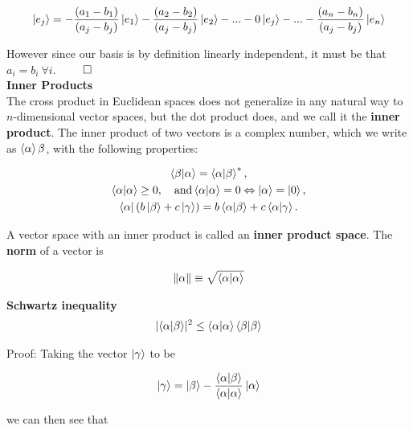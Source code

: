 \documentclass{article}
\begin{document}
\begin{gather*}
    \ket{e_{j}} = -\frac{(a_{1} - b_{1})}{(a_{j} - b_{j})}\ket{e_{1}} - \frac{(a_{2} - b_{2})}{(a_{j} - b_{j})}\ket{e_{2}} - ... - 0\ket{e_{j}} - ... - \frac{(a_{n} - b_{n})}{(a_{j} - b_{j})}\ket{e_{n}}    
\end{gather*}

However since our basis is by definition linearly independent, it must be that $a_{i} = b_{i}\ \forall i$. $\qed$ \\

\noindent \textbf{Inner Products} \\
\indent The cross product in Euclidean spaces does not generalize in any natural way to $n$-dimensional vector spaces, but the dot product does, and we call it the \textbf{inner product}. The inner product of two vectors is a complex number, which we write as $\braket{\alpha}{\beta}$, with the following properties:

\begin{gather*}
    \braket{\beta|\alpha} = \braket{\alpha|\beta}^{*}, \\
    \braket{\alpha|\alpha} \geq 0, \quad \text{and} \braket{\alpha|\alpha} = 0 \Leftrightarrow \ket{\alpha} = \ket{0}, \\
    \bra{\alpha}(b\ket{\beta} + c\ket{\gamma}) = b\braket{\alpha|\beta} + c\braket{\alpha|\gamma}.
\end{gather*}

A vector space with an inner product is called an \textbf{inner product space}. The \textbf{norm} of a vector is 

\begin{gather*}
    \lVert \alpha \rVert \equiv \sqrt{ \braket{\alpha|\alpha} }
\end{gather*}

\noindent \textbf{Schwartz inequality} \\
\begin{gather*}
    \lvert \braket{\alpha|\beta} \rvert^{2} \leq \braket{\alpha|\alpha} \braket{\beta|\beta}
\end{gather*}

Proof: Taking the vector $\ket{\gamma}$ to be

\begin{gather*}
    \ket{\gamma} = \ket{\beta} - \frac{\braket{\alpha|\beta}}{\braket{\alpha|\alpha}}\ket{\alpha}
\end{gather*}

we can then see that 
\end{document}
